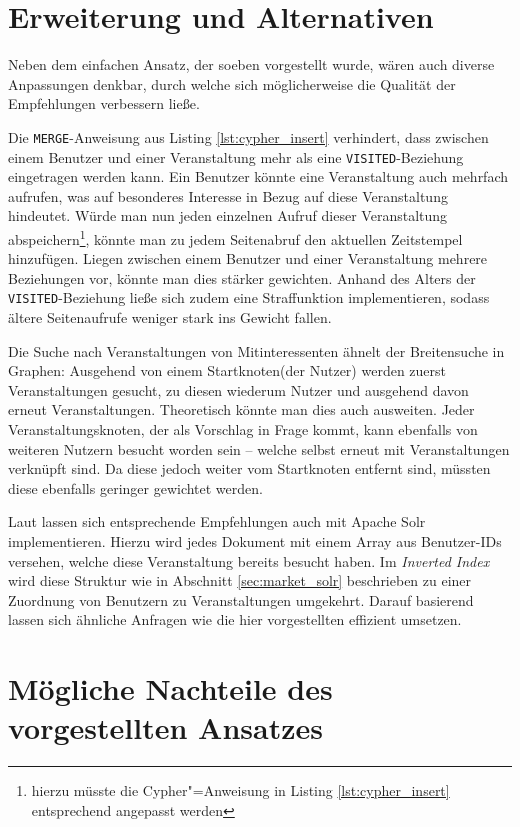 \section{Erweiterung und Alternativen}

Neben dem einfachen Ansatz, der soeben vorgestellt wurde, wären auch diverse Anpassungen denkbar, durch welche sich möglicherweise die Qualität der Empfehlungen verbessern ließe.

Die \texttt{MERGE}-Anweisung aus Listing \ref{lst:cypher_insert} verhindert, dass zwischen einem Benutzer und einer Veranstaltung mehr als eine \texttt{VISITED}-Beziehung eingetragen werden kann. Ein Benutzer könnte eine Veranstaltung auch mehrfach aufrufen, was auf besonderes Interesse in Bezug auf diese Veranstaltung hindeutet. Würde man nun jeden einzelnen Aufruf dieser Veranstaltung abspeichern\footnote{hierzu müsste die Cypher"=Anweisung in Listing \ref{lst:cypher_insert} entsprechend angepasst werden}, könnte man zu jedem Seitenabruf den aktuellen Zeitstempel hinzufügen. Liegen zwischen einem Benutzer und einer Veranstaltung mehrere Beziehungen vor, könnte man dies stärker gewichten. Anhand des Alters der \texttt{VISITED}-Beziehung ließe sich zudem eine Straffunktion implementieren, sodass ältere Seitenaufrufe weniger stark ins Gewicht fallen.

Die Suche nach Veranstaltungen von Mitinteressenten ähnelt der Breitensuche in Graphen: Ausgehend von einem Startknoten(der Nutzer) werden zuerst Veranstaltungen gesucht, zu diesen wiederum Nutzer und ausgehend davon erneut Veranstaltungen. Theoretisch könnte man dies auch ausweiten. Jeder Veranstaltungsknoten, der als Vorschlag in Frage kommt, kann ebenfalls von weiteren Nutzern besucht worden sein -- welche selbst erneut mit Veranstaltungen verknüpft sind. Da diese jedoch weiter vom Startknoten entfernt sind, müssten diese ebenfalls geringer gewichtet werden.

Laut \cite[S. 586-590]{Grainger.2014} lassen sich entsprechende Empfehlungen auch mit Apache Solr implementieren. Hierzu wird jedes Dokument mit einem Array aus Benutzer-IDs versehen, welche diese Veranstaltung bereits besucht haben. Im \emph{Inverted Index} wird diese Struktur wie in Abschnitt \ref{sec:market_solr} beschrieben zu einer Zuordnung von Benutzern zu Veranstaltungen umgekehrt. Darauf basierend lassen sich ähnliche Anfragen wie die hier vorgestellten effizient umsetzen.

\section{Mögliche Nachteile des vorgestellten Ansatzes}


